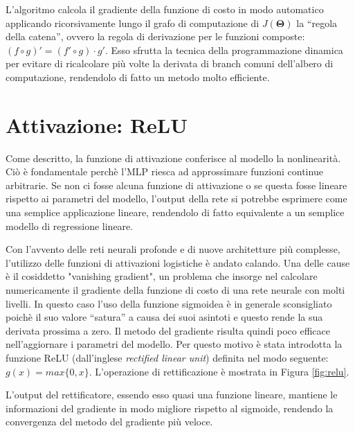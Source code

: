 \documentclass{standalone}
\begin{document}
L'algoritmo calcola il gradiente della funzione di costo in modo automatico
applicando ricorsivamente lungo il grafo di computazione di $J(\bm \Theta)$ la
``regola della catena'', ovvero la regola di derivazione per le funzioni
composte: $ (f \circ g)' = (f' \circ g)\cdot g' $. Esso sfrutta la tecnica
della programmazione dinamica per evitare di ricalcolare più volte la derivata
di branch comuni dell'albero di computazione, rendendolo di fatto un metodo
molto efficiente.
\section{Attivazione: ReLU}
Come descritto, la funzione di attivazione conferisce al modello la
nonlinearità. Ciò è fondamentale perchè l'MLP riesca ad approssimare funzioni
continue arbitrarie. Se non ci fosse alcuna funzione di attivazione o se questa
fosse lineare rispetto ai parametri del modello, l'output della rete si
potrebbe esprimere come una semplice applicazione lineare, rendendolo di fatto
equivalente a un semplice modello di regressione lineare.

Con l'avvento delle reti neurali profonde e di nuove architetture più
complesse, l'utilizzo delle funzioni di attivazioni logistiche è andato
calando. Una delle cause è il cosiddetto "vanishing gradient", un problema che
insorge nel calcolare numericamente il gradiente della funzione di costo di una
rete neurale con molti livelli. In questo caso l'uso della funzione sigmoidea è
in generale sconsigliato poichè il suo valore ``satura'' a causa dei suoi
asintoti e questo rende la sua derivata prossima a zero. Il metodo del
gradiente risulta quindi poco efficace nell'aggiornare i parametri del modello.
Per questo motivo è stata introdotta la funzione ReLU (dall'inglese
\emph{rectified linear unit}) definita nel modo seguente: 
$g(x) = max\{0, x\}$. L'operazione di rettificazione è mostrata in
Figura \ref{fig:relu}.


L'output del rettificatore, essendo esso quasi una funzione lineare, mantiene
le informazioni del gradiente in modo migliore rispetto al sigmoide,
rendendo la convergenza del metodo del gradiente più veloce.
\end{document}
